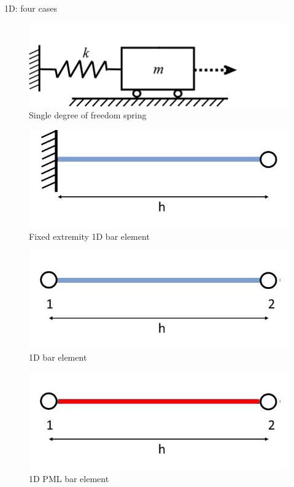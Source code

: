 \begin{frame}{1D: four cases}
\begin{figure}[ht] 
  \label{ fig7} 
  \begin{minipage}[b]{0.5\linewidth}
    \centering
    \includegraphics[width=.5\linewidth]{images/sdof-spring.png} \\
    Single degree of freedom spring
    \vspace{4ex}
  \end{minipage}%
  \begin{minipage}[b]{0.5\linewidth}
    \centering
    \includegraphics[width=.5\linewidth]{images/encastred.jpg} \\
    Fixed extremity 1D bar element
    \vspace{4ex}
  \end{minipage} 
  \begin{minipage}[b]{0.5\linewidth}
    \centering
    \includegraphics[width=.5\linewidth]{images/bar-element.jpg} \\
    1D bar element
    \vspace{4ex}
  \end{minipage}%
  \begin{minipage}[b]{0.5\linewidth}
    \centering
    \includegraphics[width=.5\linewidth]{images/bar-element-pml.jpg} \\
    1D PML bar element
    \vspace{4ex}
  \end{minipage} 
\end{figure}
\end{frame}

